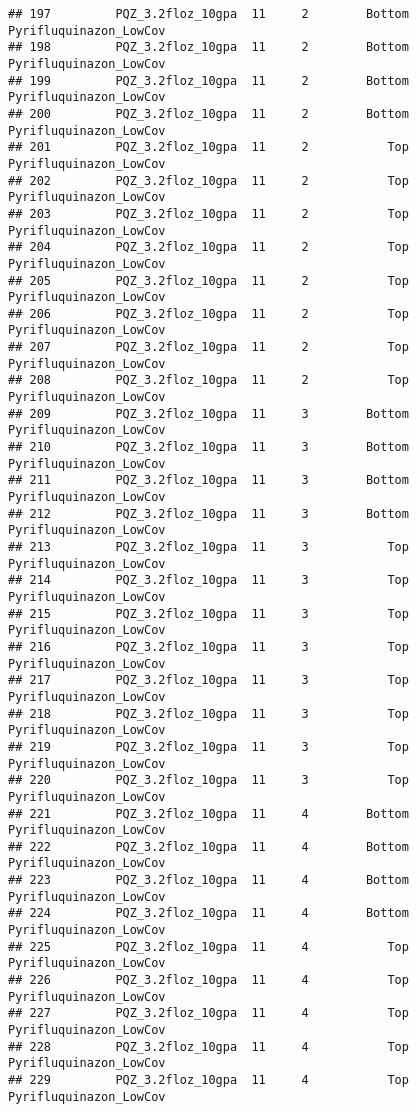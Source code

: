 \documentclass[
]{article}
\begin{document}
\begin{verbatim}
## 197         PQZ_3.2floz_10gpa  11     2        Bottom Pyrifluquinazon_LowCov
## 198         PQZ_3.2floz_10gpa  11     2        Bottom Pyrifluquinazon_LowCov
## 199         PQZ_3.2floz_10gpa  11     2        Bottom Pyrifluquinazon_LowCov
## 200         PQZ_3.2floz_10gpa  11     2        Bottom Pyrifluquinazon_LowCov
## 201         PQZ_3.2floz_10gpa  11     2           Top Pyrifluquinazon_LowCov
## 202         PQZ_3.2floz_10gpa  11     2           Top Pyrifluquinazon_LowCov
## 203         PQZ_3.2floz_10gpa  11     2           Top Pyrifluquinazon_LowCov
## 204         PQZ_3.2floz_10gpa  11     2           Top Pyrifluquinazon_LowCov
## 205         PQZ_3.2floz_10gpa  11     2           Top Pyrifluquinazon_LowCov
## 206         PQZ_3.2floz_10gpa  11     2           Top Pyrifluquinazon_LowCov
## 207         PQZ_3.2floz_10gpa  11     2           Top Pyrifluquinazon_LowCov
## 208         PQZ_3.2floz_10gpa  11     2           Top Pyrifluquinazon_LowCov
## 209         PQZ_3.2floz_10gpa  11     3        Bottom Pyrifluquinazon_LowCov
## 210         PQZ_3.2floz_10gpa  11     3        Bottom Pyrifluquinazon_LowCov
## 211         PQZ_3.2floz_10gpa  11     3        Bottom Pyrifluquinazon_LowCov
## 212         PQZ_3.2floz_10gpa  11     3        Bottom Pyrifluquinazon_LowCov
## 213         PQZ_3.2floz_10gpa  11     3           Top Pyrifluquinazon_LowCov
## 214         PQZ_3.2floz_10gpa  11     3           Top Pyrifluquinazon_LowCov
## 215         PQZ_3.2floz_10gpa  11     3           Top Pyrifluquinazon_LowCov
## 216         PQZ_3.2floz_10gpa  11     3           Top Pyrifluquinazon_LowCov
## 217         PQZ_3.2floz_10gpa  11     3           Top Pyrifluquinazon_LowCov
## 218         PQZ_3.2floz_10gpa  11     3           Top Pyrifluquinazon_LowCov
## 219         PQZ_3.2floz_10gpa  11     3           Top Pyrifluquinazon_LowCov
## 220         PQZ_3.2floz_10gpa  11     3           Top Pyrifluquinazon_LowCov
## 221         PQZ_3.2floz_10gpa  11     4        Bottom Pyrifluquinazon_LowCov
## 222         PQZ_3.2floz_10gpa  11     4        Bottom Pyrifluquinazon_LowCov
## 223         PQZ_3.2floz_10gpa  11     4        Bottom Pyrifluquinazon_LowCov
## 224         PQZ_3.2floz_10gpa  11     4        Bottom Pyrifluquinazon_LowCov
## 225         PQZ_3.2floz_10gpa  11     4           Top Pyrifluquinazon_LowCov
## 226         PQZ_3.2floz_10gpa  11     4           Top Pyrifluquinazon_LowCov
## 227         PQZ_3.2floz_10gpa  11     4           Top Pyrifluquinazon_LowCov
## 228         PQZ_3.2floz_10gpa  11     4           Top Pyrifluquinazon_LowCov
## 229         PQZ_3.2floz_10gpa  11     4           Top Pyrifluquinazon_LowCov

\end{verbatim}
\end{document}
